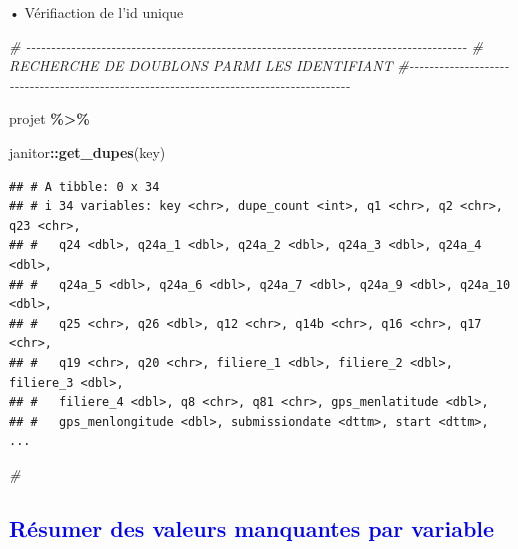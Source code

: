 \documentclass[
]{article}
\newenvironment{Shaded}{\begin{snugshade}}{\end{snugshade}}
\newcommand{\CommentTok}[1]{\textcolor[rgb]{0.56,0.35,0.01}{\textit{#1}}}
\newcommand{\FunctionTok}[1]{\textcolor[rgb]{0.13,0.29,0.53}{\textbf{#1}}}
\newcommand{\NormalTok}[1]{#1}
\newcommand{\SpecialCharTok}[1]{\textcolor[rgb]{0.81,0.36,0.00}{\textbf{#1}}}
\begin{document}
• Vérifiaction de l'id unique

\begin{Shaded}
\begin{Highlighting}[]
\CommentTok{\# {-}{-}{-}{-}{-}{-}{-}{-}{-}{-}{-}{-}{-}{-}{-}{-}{-}{-}{-}{-}{-}{-}{-}{-}{-}{-}{-}{-}{-}{-}{-}{-}{-}{-}{-}{-}{-}{-}{-}{-}{-}{-}{-}{-}{-}{-}{-}{-}{-}{-}{-}{-}{-}{-}{-}{-}{-}{-}{-}{-}{-}{-}{-}{-}{-}{-}{-}{-}{-}{-}{-}{-}{-}{-}{-}{-}{-}{-}{-}{-}{-}{-}{-}{-}{-}{-}{-}{-}}
\CommentTok{\#  RECHERCHE DE DOUBLONS PARMI LES IDENTIFIANT                }
\CommentTok{\#{-}{-}{-}{-}{-}{-}{-}{-}{-}{-}{-}{-}{-}{-}{-}{-}{-}{-}{-}{-}{-}{-}{-}{-}{-}{-}{-}{-}{-}{-}{-}{-}{-}{-}{-}{-}{-}{-}{-}{-}{-}{-}{-}{-}{-}{-}{-}{-}{-}{-}{-}{-}{-}{-}{-}{-}{-}{-}{-}{-}{-}{-}{-}{-}{-}{-}{-}{-}{-}{-}{-}{-}{-}{-}{-}{-}{-}{-}{-}{-}{-}{-}{-}{-}{-}{-}{-}{-}}

\NormalTok{projet }\SpecialCharTok{\%\textgreater{}\%} 
  
\NormalTok{  janitor}\SpecialCharTok{::}\FunctionTok{get\_dupes}\NormalTok{(key) }
\end{Highlighting}
\end{Shaded}

\begin{verbatim}
## # A tibble: 0 x 34
## # i 34 variables: key <chr>, dupe_count <int>, q1 <chr>, q2 <chr>, q23 <chr>,
## #   q24 <dbl>, q24a_1 <dbl>, q24a_2 <dbl>, q24a_3 <dbl>, q24a_4 <dbl>,
## #   q24a_5 <dbl>, q24a_6 <dbl>, q24a_7 <dbl>, q24a_9 <dbl>, q24a_10 <dbl>,
## #   q25 <chr>, q26 <dbl>, q12 <chr>, q14b <chr>, q16 <chr>, q17 <chr>,
## #   q19 <chr>, q20 <chr>, filiere_1 <dbl>, filiere_2 <dbl>, filiere_3 <dbl>,
## #   filiere_4 <dbl>, q8 <chr>, q81 <chr>, gps_menlatitude <dbl>,
## #   gps_menlongitude <dbl>, submissiondate <dttm>, start <dttm>, ...
\end{verbatim}

\begin{Shaded}
\begin{Highlighting}[]
\CommentTok{\#}
\end{Highlighting}
\end{Shaded}

\textcolor{blue}{\subsection{Résumer des valeurs manquantes par variable}}
\end{document}
